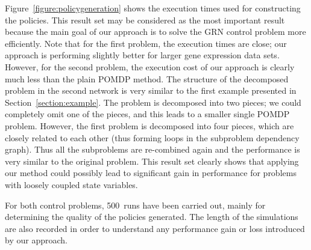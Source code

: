 Figure~\ref{figure:policygeneration} shows the execution times used for constructing the policies. This
result set may be considered as the most important result because the main goal of our approach is to solve
the GRN control problem more efficiently. Note that for the first problem, the execution times are close; our
approach is performing slightly better for larger gene expression data sets. However, for the second problem,
the execution cost of our approach is clearly much less than the plain POMDP method. The structure of the
decomposed problem in the second network is very similar to the first example presented in
Section~\ref{section:example}. The problem is decomposed into two pieces; we could completely omit one of the
pieces, and this leads to a smaller single POMDP problem. However, the first problem is decomposed into four
pieces, which are closely related to each other (thus forming loops in the subproblem dependency graph). Thus
all the subproblems are re-combined again and the performance is very similar to the original problem. This
result set clearly shows that applying our method could possibly lead to significant gain in performance for
problems with loosely coupled state variables.

For both control problems, 500~runs have been carried out, mainly for determining the quality of
the policies generated. The length of the simulations are also recorded in order to understand any
performance gain or loss introduced by our approach.

